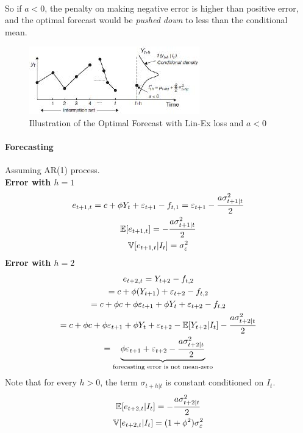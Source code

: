 \documentclass[11pt]{article}
\begin{document}
\begin{example}
\begin{gather}
				\end{gather} 
				So if $a < 0$, the penalty on making negative error is higher than positive error, and the optimal forecast would be \emph{pushed down} to less than the conditional mean.
				\begin{figure}[H]
					\centering
					\includegraphics{figures/asym_loss_forecast}
					\caption{Illustration of the Optimal Forecast with Lin-Ex loss and $a < 0$}
				\end{figure}
				\paragraph{Forecasting} Assuming AR(1) process. \\
				\textbf{Error with $h=1$}
					\begin{gather}
						e_{t+1, t} = c + \phi Y_t + \varepsilon_{t+1} - f_{t,1}
						= \varepsilon_{t+1} -\frac{a \sigma_{t+1|t}^2}{2} \\
						\mathbb{E}[{e_{t+1, t}}] = - \frac{a \sigma_{t+1|t}^2}{2} \\
						\mathbb{V}[{e_{t+1,t}|I_t}] = \sigma_\varepsilon^2
					\end{gather}
				\textbf{Error with $h=2$}
					\begin{gather}
						e_{t+2, t} = Y_{t+2} - f_{t, 2} \\
						= c + \phi(Y_{t+1}) + \varepsilon_{t+2} - f_{t,2} \\
						= c + \phi c + \phi \varepsilon_{t+1} + \phi Y_t + \varepsilon_{t+2} - f_{t,2} \\
						= c + \phi c + \phi \varepsilon_{t+1} + \phi Y_t + \varepsilon_{t+2} - \mathbb{E}[{Y_{t+2}|I_t}] - \frac{a \sigma_{t+2|t}^2}{2} \\
						= \underbrace{\phi \varepsilon_{t+1} + \varepsilon_{t+2} -  \frac{a \sigma_{t+2|t}^2}{2}}_{\text{{forecasting error is not mean-zero}}}
					\end{gather}
					Note that for every $h > 0$, the term $\sigma_{t+h|t}$ is constant conditioned on $I_t$.
					\begin{gather}
						\mathbb{E}[{e_{t+2,t}|I_t}] = - \frac{a \sigma_{t+2|t}^2}{2} \\
						\mathbb{V}[{e_{t+2,t}|I_t}] = (1 + \phi^2) \sigma_\varepsilon^2
					\end{gather}
			\end{example}
	
\end{document}
